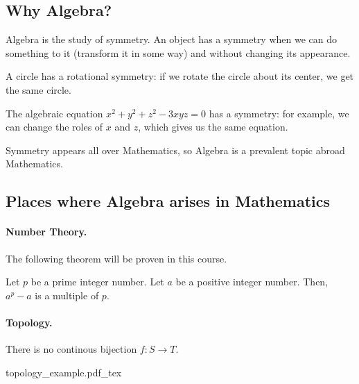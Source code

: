 
\subsection{Why Algebra?}

Algebra is the study of symmetry. An object has a symmetry when we can do something to it (transform it in some way) and without changing its appearance.

\begin{exmp}
	A circle has a rotational symmetry: if we rotate the circle about its center, we get the same circle.
\end{exmp}

\begin{exmp}
	The algebraic equation $x^2 + y^2 + z^2 - 3xyz = 0$ has a symmetry: for example, we can change the roles of $x$ and $z$, which gives us the same equation.
\end{exmp}

Symmetry appears all over Mathematics, so Algebra is a prevalent topic abroad Mathematics.

\subsection{Places where Algebra arises in Mathematics}

\paragraph{Number Theory.}
The following theorem will be proven in this course.

\begin{thm}
	Let $p$ be a prime integer number. Let $a$ be a positive integer number. Then, $a^p - a$ is a multiple of $p$.
\end{thm}

\paragraph{Topology.}

\begin{thm}
	There is no continous bijection $f: S \to T$.

	\begin{center}
		\def\svgwidth{5cm}
		{topology_example.pdf_tex}
	\end{center}
\end{thm}

